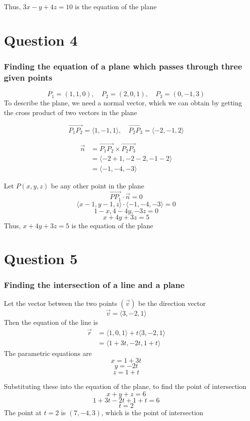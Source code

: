 \documentclass{article}
\begin{document}
Thus, \(3x -y +4z = 10\) is the equation of the plane

\section*{Question 4}
\subsubsection*{Finding the equation of a plane which passes through three given points}
\[
P_1 =(1,1,0), \quad P_2 = (2,0,1),\quad P_3 = (0,-1,3)
\]
To describe the plane, we need a normal vector, which we can obtain by getting the cross product of two vectors
in the plane

\[
\overrightarrow{P_1P_2} = \langle 1,-1,1 \rangle, \quad \overrightarrow{P_2P_3} = \langle -2,-1,2 \rangle
\]

\begin{align*}
    \vec{n} &= \overrightarrow{P_1P_2} \times \overrightarrow{P_2P_3} \\
    &= \langle -2 +1,-2 -2, -1-2 \rangle \\
    &= \langle -1,-4,-3 \rangle
\end{align*}

Let \(P(x,y,z)\) be any other point in the plane
\[
\overrightarrow{PP_1} \cdot \vec{n} = 0
\]
\[
\langle x-1,y-1,z \rangle \cdot \langle -1,-4,-3 \rangle = 0
\]
\[
1-x,4-4y, -3z = 0
\]
\[
x+4y+3z = 5
\]
Thus, \(x+4y+3z = 5\) is the equation of the plane

\section*{Question 5}
\subsubsection*{Finding the intersection of a line and a plane}
Let the vector between the two points \((\vec{v})\) be the direction vector
\[
\vec{v} = \langle 3,-2,1 \rangle
\]
Then the equation of the line is
\begin{align*}
    \vec{r} &= \langle 1,0,1 \rangle + t\langle 3,-2,1 \rangle \\
    &= \langle 1+3t, -2t, 1+t \rangle
\end{align*}
The parametric equations are
\[
x = 1+3t 
\]
\[
y= -2t
\]
\[
z = 1+t
\]

Substituting these into the equation of the plane, to find the point of intersection
\[
x +y+z = 6
\]
\[
1+3t-2t+1+t = 6
\]
\[
t = 2
\]
The point at \(t = 2\) is \((7, -4, 3)\), which is the point of intersection
\end{document}
